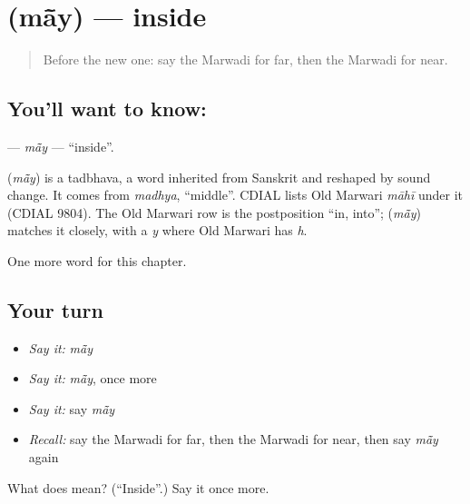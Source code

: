 \section[\texorpdfstring{\mw{मांय} (mā̃y)}{मांय (mā̃y)}]{ (mā̃y) — inside}

\label{lesson:MW-C81-may}



\begin{quote}
Before the new one: say the Marwadi for far, then the Marwadi for near.
\end{quote}

\subsection*{You'll want to know: }
\textbf{} — \emph{mā̃y} — \textquotedblleft{}inside\textquotedblright{}.

\begin{cousinweb}
\textbf{} (\emph{mā̃y}) is a tadbhava, a word inherited from Sanskrit and reshaped by sound change. It comes from \emph{madhya}, \textquotedblleft{}middle\textquotedblright{}. CDIAL lists Old Marwari \emph{māhī} under it (CDIAL 9804). The Old Marwari row is the postposition \textquotedblleft{}in, into\textquotedblright{}; \textbf{} (\emph{mā̃y}) matches it closely, with a \emph{y} where Old Marwari has \emph{h}.
\end{cousinweb}

\begin{grammarlens}[title={What you've built}]
One more word for this chapter.
\end{grammarlens}

\subsection*{Your turn}
\begin{itemize}
\raggedright
  \item \emph{Say it:} \emph{mā̃y}
  \item \emph{Say it:} \emph{mā̃y}, once more
  \item \emph{Say it:} say \emph{mā̃y}
  \item \emph{Recall:} say the Marwadi for far, then the Marwadi for near, then say \emph{mā̃y} again
\end{itemize}

\begin{tcolorbox}[breakable,colback=teal!4,colframe=teal!35!black,title={Before you move on}]
What does  mean? (\textquotedblleft{}Inside\textquotedblright{}.) Say it once more.
\end{tcolorbox}
